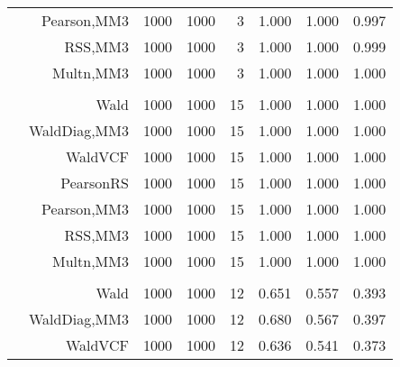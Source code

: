 \documentclass[
]{article}
\begin{document}
\begin{table}[H]
{\begin{tabular}[t]{lrrrrrrr}
\hspace{1em} & Pearson,MM3 & 1000 & 1000 & 3 & 1.000 & 1.000 & 0.997\\

\hspace{1em} & RSS,MM3 & 1000 & 1000 & 3 & 1.000 & 1.000 & 0.999\\

\hspace{1em} & Multn,MM3 & 1000 & 1000 & 3 & 1.000 & 1.000 & 1.000\\
\cmidrule{1-8}
\addlinespace[0.3em]
\multicolumn{8}{l}{\textbf{1F 15V}}\\
\hspace{1em} & Wald & 1000 & 1000 & 15 & 1.000 & 1.000 & 1.000\\

\hspace{1em} & WaldDiag,MM3 & 1000 & 1000 & 15 & 1.000 & 1.000 & 1.000\\

\hspace{1em} & WaldVCF & 1000 & 1000 & 15 & 1.000 & 1.000 & 1.000\\

\hspace{1em} & PearsonRS & 1000 & 1000 & 15 & 1.000 & 1.000 & 1.000\\

\hspace{1em} & Pearson,MM3 & 1000 & 1000 & 15 & 1.000 & 1.000 & 1.000\\

\hspace{1em} & RSS,MM3 & 1000 & 1000 & 15 & 1.000 & 1.000 & 1.000\\

\hspace{1em} & Multn,MM3 & 1000 & 1000 & 15 & 1.000 & 1.000 & 1.000\\
\cmidrule{1-8}
\addlinespace[0.3em]
\multicolumn{8}{l}{\textbf{2F 10V}}\\
\hspace{1em} & Wald & 1000 & 1000 & 12 & 0.651 & 0.557 & 0.393\\

\hspace{1em} & WaldDiag,MM3 & 1000 & 1000 & 12 & 0.680 & 0.567 & 0.397\\

\hspace{1em} & WaldVCF & 1000 & 1000 & 12 & 0.636 & 0.541 & 0.373\\


\end{tabular}}
\end{table}
\end{document}
